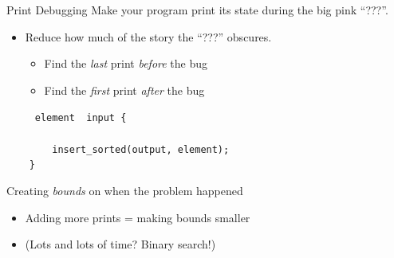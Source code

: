 \documentclass[xcolor=dvipsnames]{beamer}
\begin{document}
\begin{frame}{Print Debugging}
	Make your program print its state during the big pink ``???''.
	\begin{itemize}
		\item Reduce how much of the story the ``???'' obscures.
		\begin{itemize}
			\item Find the {\em last} print {\em before} the bug
			\item Find the {\em first} print {\em after} the bug
		\end{itemize}
	\end{itemize}
	\pause

	\linegap
		\texttt{~~~~~element~~input~\{} \\
		\texttt{~~~~~~~~} \\
		\texttt{~~~~~~~~insert\_sorted(output,~element);} \\
		\texttt{~~~~\}} \\
	\pause
	\linegap

	Creating {\em bounds} on when the problem happened
	\begin{itemize}
		\item Adding more prints = making bounds smaller
		\item (Lots and lots of time? Binary search!)
	\end{itemize}
\end{frame}
\end{document}
